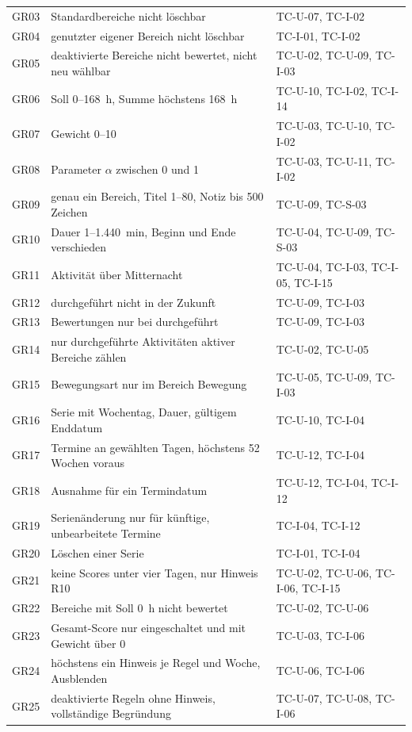 \begin{longtable}{@{}L{1.5cm}L{9.3cm}L{5.3cm}@{}}
  GR03 & Standardbereiche nicht löschbar & TC-U-07, TC-I-02 \\
  GR04 & genutzter eigener Bereich nicht löschbar & TC-I-01, TC-I-02 \\
  GR05 & deaktivierte Bereiche nicht bewertet, nicht neu wählbar & TC-U-02, TC-U-09, TC-I-03 \\
  GR06 & Soll 0--168~h, Summe höchstens 168~h & TC-U-10, TC-I-02, TC-I-14 \\
  GR07 & Gewicht 0--10 & TC-U-03, TC-U-10, TC-I-02 \\
  GR08 & Parameter $\alpha$ zwischen 0 und 1 & TC-U-03, TC-U-11, TC-I-02 \\
  GR09 & genau ein Bereich, Titel 1--80, Notiz bis 500 Zeichen & TC-U-09, TC-S-03 \\
  GR10 & Dauer 1--1.440~min, Beginn und Ende verschieden & TC-U-04, TC-U-09, TC-S-03 \\
  GR11 & Aktivität über Mitternacht & TC-U-04, TC-I-03, TC-I-05, TC-I-15 \\
  GR12 & durchgeführt nicht in der Zukunft & TC-U-09, TC-I-03 \\
  GR13 & Bewertungen nur bei durchgeführt & TC-U-09, TC-I-03 \\
  GR14 & nur durchgeführte Aktivitäten aktiver Bereiche zählen & TC-U-02, TC-U-05 \\
  GR15 & Bewegungsart nur im Bereich Bewegung & TC-U-05, TC-U-09, TC-I-03 \\
  GR16 & Serie mit Wochentag, Dauer, gültigem Enddatum & TC-U-10, TC-I-04 \\
  GR17 & Termine an gewählten Tagen, höchstens 52 Wochen voraus & TC-U-12, TC-I-04 \\
  GR18 & Ausnahme für ein Termindatum & TC-U-12, TC-I-04, TC-I-12 \\
  GR19 & Serienänderung nur für künftige, unbearbeitete Termine & TC-I-04, TC-I-12 \\
  GR20 & Löschen einer Serie & TC-I-01, TC-I-04 \\
  GR21 & keine Scores unter vier Tagen, nur Hinweis R10 & TC-U-02, TC-U-06, TC-I-06, TC-I-15 \\
  GR22 & Bereiche mit Soll 0~h nicht bewertet & TC-U-02, TC-U-06 \\
  GR23 & Gesamt-Score nur eingeschaltet und mit Gewicht über 0 & TC-U-03, TC-I-06 \\
  GR24 & höchstens ein Hinweis je Regel und Woche, Ausblenden & TC-U-06, TC-I-06 \\
  GR25 & deaktivierte Regeln ohne Hinweis, vollständige Begründung & TC-U-07, TC-U-08, TC-I-06 \\

\end{longtable}
